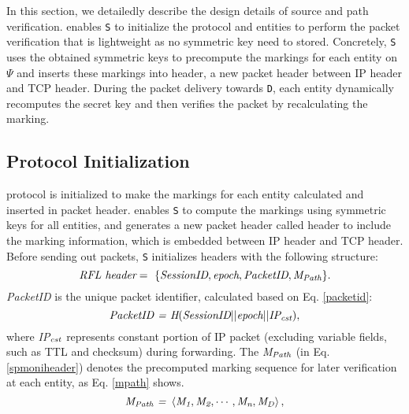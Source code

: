 In this section, we detailedly describe the design details of source and path verification. \name{} enables {\tt S} to initialize the \name{} protocol and entities to perform the packet verification that is lightweight as no symmetric key need to stored. Concretely, {\tt S} uses the obtained symmetric keys to precompute the markings for each entity on $\Psi$ and inserts these markings into \name{} header, a new packet header between IP header and TCP header. During the packet delivery towards {\tt D}, each entity dynamically recomputes the secret key and then verifies the packet by recalculating the marking.
\vspace{-0.1in}
\subsection{\name{} Protocol Initialization}
\label{spmoniheaderinitialization}
\name{} protocol is initialized to make the markings for each entity calculated and inserted in packet header. \name{} enables {\tt S} to compute the markings using symmetric keys for all entities, and generates a new packet header called \name{} header to include the marking information, which is embedded between IP header and TCP header. Before sending out packets, {\tt S} initializes \name{} headers with the following structure:
\begin{equation}\label{spmoniheader}
\emph{\name{} header} =~ \{\emph{SessionID}, \emph{epoch}, \emph{PacketID}, \emph{M}_{\emph{Path}}\}.
\end{equation}
\noindent \emph{PacketID} is the unique packet identifier, calculated based on Eq. \ref{packetid}:
\begin{equation}\label{packetid}
\emph{PacketID = H}(\emph{SessionID} \vert \vert \emph{epoch} \vert \vert \emph{IP}_{\emph{cst}}),
\end{equation}
\noindent where \emph{IP}$_{\emph{cst}}$ represents constant portion of IP packet (excluding variable fields, such as TTL and checksum) during forwarding. The \emph{M}$_{\emph{Path}}$ (in Eq. \ref{spmoniheader}) denotes the precomputed marking sequence for later verification at each entity, as Eq. \ref{mpath} shows.
\begin{equation}\label{mpath}
    \emph{M}_{\emph{Path}} ~\emph{=}~ \left \langle \emph{M}_\emph{1}, \emph{M}_\emph{2}, \cdots, \emph{M}_\emph{n}, \emph{M}_\emph{\emph{\emph{D}}} \right \rangle,
\end{equation}
